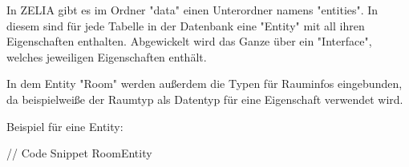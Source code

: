 
In ZELIA gibt es im Ordner "data" einen Unterordner namens "entities". In diesem sind für jede Tabelle in der Datenbank eine "Entity" mit all ihren Eigenschaften enthalten. Abgewickelt wird das Ganze über ein "Interface", welches jeweiligen Eigenschaften enthält.

In dem Entity "Room" werden außerdem die Typen für Rauminfos eingebunden, da beispielweiße der Raumtyp als Datentyp für eine Eigenschaft verwendet wird.

Beispiel für eine Entity:

// Code Snippet RoomEntity
